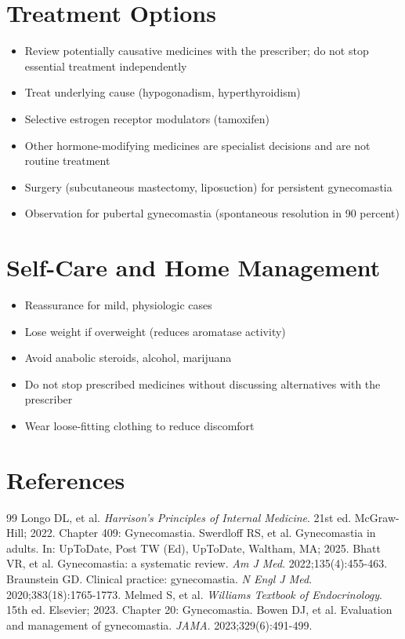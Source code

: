 \section*{Treatment Options}
\begin{itemize}
\item Review potentially causative medicines with the prescriber; do not stop essential treatment independently
\item Treat underlying cause (hypogonadism, hyperthyroidism)
\item Selective estrogen receptor modulators (tamoxifen)
\item Other hormone-modifying medicines are specialist decisions and are not routine treatment
\item Surgery (subcutaneous mastectomy, liposuction) for persistent gynecomastia
\item Observation for pubertal gynecomastia (spontaneous resolution in 90 percent)
\end{itemize}

\section*{Self-Care and Home Management}
\begin{itemize}
\item Reassurance for mild, physiologic cases
\item Lose weight if overweight (reduces aromatase activity)
\item Avoid anabolic steroids, alcohol, marijuana
\item Do not stop prescribed medicines without discussing alternatives with the prescriber
\item Wear loose-fitting clothing to reduce discomfort
\end{itemize}

\section*{References}

\begin{thebibliography}{99}
 Longo DL, et al. \emph{Harrison's Principles of Internal Medicine}. 21st ed. McGraw-Hill; 2022. Chapter 409: Gynecomastia.
 Swerdloff RS, et al. Gynecomastia in adults. In: UpToDate, Post TW (Ed), UpToDate, Waltham, MA; 2025.
 Bhatt VR, et al. Gynecomastia: a systematic review. \emph{Am J Med}. 2022;135(4):455-463.
 Braunstein GD. Clinical practice: gynecomastia. \emph{N Engl J Med}. 2020;383(18):1765-1773.
 Melmed S, et al. \emph{Williams Textbook of Endocrinology}. 15th ed. Elsevier; 2023. Chapter 20: Gynecomastia.
 Bowen DJ, et al. Evaluation and management of gynecomastia. \emph{JAMA}. 2023;329(6):491-499.
\end{thebibliography}
